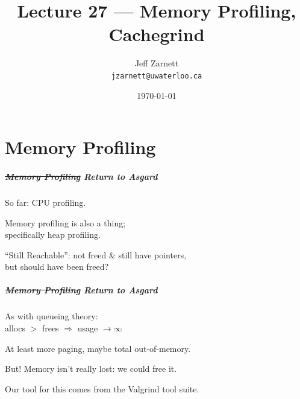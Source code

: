 
\usepackage{soul}

\title{Lecture 27 --- Memory Profiling, Cachegrind }

\author{Jeff Zarnett \\ \small \texttt{jzarnett@uwaterloo.ca}}
\date{\today}




\begin{frame}
  \titlepage

 \end{frame}

\part{Memory Profiling}
\begin{frame}
\partpage
\end{frame}

\begin{frame}
\frametitle{\st{Memory Profiling} Return to Asgard}

\large
\begin{changemargin}{2cm}
So far: CPU profiling. 

Memory profiling is also a thing; \\
\qquad specifically heap profiling.

``Still Reachable'': not freed \& still have pointers, \\
\qquad but should have been freed?
\end{changemargin}

\end{frame}



\begin{frame}
\frametitle{\st{Memory Profiling} Return to Asgard}

\large
\begin{changemargin}{2cm}
As with queueing theory:\\
\qquad allocs $>$ frees $\Longrightarrow$ usage $\rightarrow \infty$

At least more paging, maybe total out-of-memory.

But! Memory isn't really lost: we could free it.

Our tool for this comes from the Valgrind tool suite.
\end{changemargin}

\end{frame}



